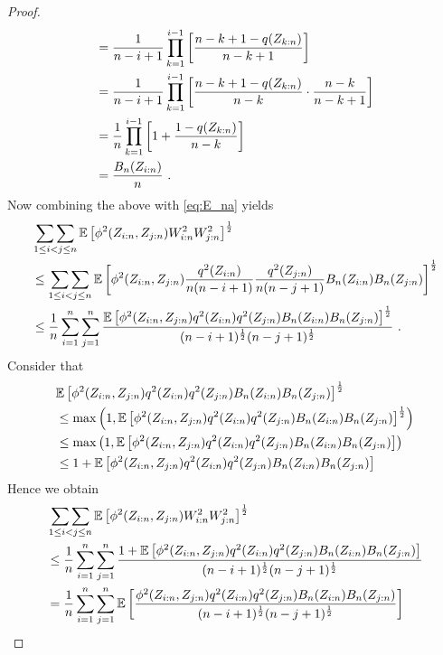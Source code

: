\begin{lemma}
\begin{proof}
\begin{align*}
		&=  \frac{1}{n-i+1}\prod_{k=1}^{i-1}\left[\frac{n-k+1-q(Z_{k:n})}{n-k+1}\right] \\
		&=  \frac{1}{n-i+1}\prod_{k=1}^{i-1}\left[\frac{n-k+1-q(Z_{k:n})}{n-k} \cdot \frac{n-k}{n-k+1}\right]\\
		&=  \frac{1}{n}\prod_{k=1}^{i-1}\left[1+\frac{1-q(Z_{k:n})}{n-k}\right]\\
		&=  \frac{B_n(Z_{i:n})}{n}\textrm{ .}
		\end{align*}
		Now combining the above with \eqref{eq:E_na} yields 
		\begin{align*}
		&\mathop{\sum\sum}\limits_{1\leq i<j\leq n}\mathbb{E}\left[\phi^2(Z_{i:n}, Z_{j:n}) W^2_{i:n} W^2_{j:n}\right]^{\frac{1}{2}}\\
		&\leq \mathop{\sum\sum}\limits_{1\leq i<j\leq n}\mathbb{E}\left[\phi^2(Z_{i:n}, Z_{j:n}) \frac{q^2(Z_{i:n})}{n(n-i+1)}\frac{q^2(Z_{j:n})}{n(n-j+1)} B_n(Z_{i:n})B_n(Z_{j:n})\right]^\frac{1}{2}\\
		&\leq \frac{1}{n}\sum_{i=1}^{n}\sum_{j=1}^{n}\frac{\mathbb{E}\left[\phi^2(Z_{i:n}, Z_{j:n}) q^2(Z_{i:n})q^2(Z_{j:n}) B_n(Z_{i:n})B_n(Z_{j:n})\right]^\frac{1}{2}}{(n-i+1)^\frac{1}{2}(n-j+1)^\frac{1}{2}} \textrm{ .}
		\end{align*}
		Consider that 
		\begin{align*}
		& \mathbb{E}\left[\phi^2(Z_{i:n}, Z_{j:n}) q^2(Z_{i:n})q^2(Z_{j:n}) B_n(Z_{i:n})B_n(Z_{j:n})\right]^\frac{1}{2}\\
		&\leq \max\left(1, \mathbb{E}\left[\phi^2(Z_{i:n}, Z_{j:n}) q^2(Z_{i:n})q^2(Z_{j:n}) B_n(Z_{i:n})B_n(Z_{j:n})\right]^\frac{1}{2}\right)\\
		&\leq \max\left(1, \mathbb{E}\left[\phi^2(Z_{i:n}, Z_{j:n}) q^2(Z_{i:n})q^2(Z_{j:n}) B_n(Z_{i:n})B_n(Z_{j:n})\right]\right)\\
		&\leq 1 + \mathbb{E}\left[\phi^2(Z_{i:n}, Z_{j:n}) q^2(Z_{i:n})q^2(Z_{j:n}) B_n(Z_{i:n})B_n(Z_{j:n})\right]\\
		\end{align*}
		Hence we obtain
		\begin{align*}
		&\doublesum\limits_{1\leq i<j\leq n}\E\left[\phi^2(Z_{i:n}, Z_{j:n}) W^2_{i:n} W^2_{j:n}\right]^{\frac{1}{2}}\\
		&\leq \frac{1}{n}\sum_{i=1}^{n}\sum_{j=1}^{n}\frac{1 + \E\left[\phi^2(Z_{i:n}, Z_{j:n}) q^2(Z_{i:n})q^2(Z_{j:n}) B_n(Z_{i:n})B_n(Z_{j:n})\right]}{(n-i+1)^\frac{1}{2}(n-j+1)^\frac{1}{2}}\\
		&= \frac{1}{n}\sum_{i=1}^{n}\sum_{j=1}^{n}\E\left[\frac{\phi^2(Z_{i:n}, Z_{j:n}) q^2(Z_{i:n})q^2(Z_{j:n}) B_n(Z_{i:n})B_n(Z_{j:n})}{(n-i+1)^\frac{1}{2}(n-j+1)^\frac{1}{2}}\right]\\

\end{align*}
\end{proof}
\end{lemma}
